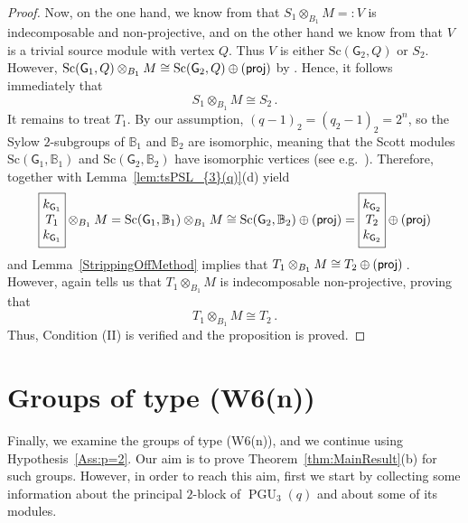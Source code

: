 \documentclass[12pt,a4paper]{amsart}
\theoremstyle{plain}\newtheorem{Theorem}{Theorem}[section]
\theoremstyle{plain}\newtheorem{Conjecture}[Theorem]{Conjecture}
\theoremstyle{plain}\newtheorem{Corollary}[Theorem]{Corollary}
\theoremstyle{plain}\newtheorem{Lemma}[Theorem]{Lemma}
\theoremstyle{plain}\newtheorem{Proposition}[Theorem]{Proposition}
\theoremstyle{definition}\newtheorem{Definition}[Theorem]{Definition}
\theoremstyle{definition}\newtheorem{Example}[Theorem]{Example}
\theoremstyle{definition}\newtheorem{Examples}[Theorem]{Examples}
\theoremstyle{definition}\newtheorem{Remark}[Theorem]{Remark}
\theoremstyle{definition}\newtheorem{Question}[Theorem]{Question}
\theoremstyle{definition}\newtheorem{Notation}[Theorem]{Notation}
\theoremstyle{definition}\newtheorem{Hypothesis}[Theorem]{Hypothesis}
\theoremstyle{definition}\newtheorem{Assumption}[Theorem]{Assumption}
\theoremstyle{definition}\newtheorem{Strategy}[Theorem]{Strategy}
\theoremstyle{definition}\newtheorem{Contents}[Theorem]{Contents}
\theoremstyle{definition}\newtheorem{Computations}[Theorem]{Computations}
\theoremstyle{definition}\newtheorem{Equivalences}[Theorem]{Equivalences}
\theoremstyle{definition}\newtheorem{Notation/Definition}[Theorem]{Notation/Definition}
\theoremstyle{definition}\newtheorem{noth}[Theorem]{}
\theoremstyle{plain}\newtheorem{Step}[Theorem]{Step}
\newcommand{\PGU}{\operatorname{PGU}}
\newcommand{\Sc}{{\text{Sc}}}
\begin{document}
\begin{proof}
Now, on the one hand, we know  from \cite[Theorem 2.1(a)]{KL20a} that  $S_1\otimes_{B_1}M=:V$ is indecomposable and non-projective, and on the other hand we know from \cite[Lemma 3.4(b)]{KL20a}
that $V$ is a trivial source module with vertex $Q$. Thus $V$ is either $\Sc(\mathsf{G}_2,Q)$ or $S_2$. However, $\Sc(\mathsf{G}_{1},Q)\otimes_{B_1}M\cong \Sc(\mathsf{G}_{2},Q)\oplus\text{({\sf proj})}$ by \cite[Lemma 3.4(c)]{KL20a}.
Hence, it follows immediately  that 
$$S_1\otimes_{B_1}M\cong S_2\,. $$
It remains to treat $T_{1}$. By our assumption, $(q-1)_2=(q_2-1)_2=2^n$, so the Sylow $2$-subgroups of 
$\mathbb B_{1}$ and $\mathbb B_2$ are isomorphic, meaning that the Scott modules $\Sc(\mathsf{G}_1, \mathbb B_{1})$ and $\Sc(\mathsf{G}_2, \mathbb B_{2})$
have isomorphic vertices (see e.g.~\cite[Corollary 4.8.5]{NT89}). Therefore, \cite[Lemma 3.4(c)]{KL20a} together with Lemma~\ref{lem:tsPSL_{3}(q)}(d) yield
$$
\boxed{\begin{matrix}k_{\mathsf{G}_1}\\ T_{1}\\ k_{\mathsf{G}_1}\end{matrix}}\otimes_{B_1}M 
= \Sc(\mathsf{G}_1, \mathbb B_{1})\otimes_{B_1}M
\cong \Sc(\mathsf{G}_2, \mathbb B_{2}) \oplus\text{({\sf proj})}
= \boxed{\begin{matrix}k_{\mathsf{G}_2}\\ T_{2}\\ k_{\mathsf{G}_2}\end{matrix}} \oplus\text{({\sf proj})}
$$
and Lemma~\ref{StrippingOffMethod} implies that  $T_1\otimes_{B_1}M\cong T_2  \oplus\text{({\sf proj})}$\,. However, again \cite[Theorem~2.1(a)]{KL20a} tells us that $T_1\otimes_{B_1}M$ is indecomposable non-projective, proving that
$$T_1\otimes_{B_1}M\cong T_2\,. $$
Thus, Condition (II) is verified and the proposition is proved. 
 \end{proof}
 
 
 
 
 






\section{Groups of type {\sf (W6(n))}}\label{sec:W6}


Finally, we examine the groups of type {\sf (W6(n))}, and we continue using Hypothesis~\ref{Ass:p=2}. 
Our aim is to prove Theorem~\ref{thm:MainResult}(b) for such groups.  
However, in order to reach this aim, first we start by collecting some information about the principal $2$-block of $\PGU_{3}(q)$ 
and about some of its modules.
\end{document}
